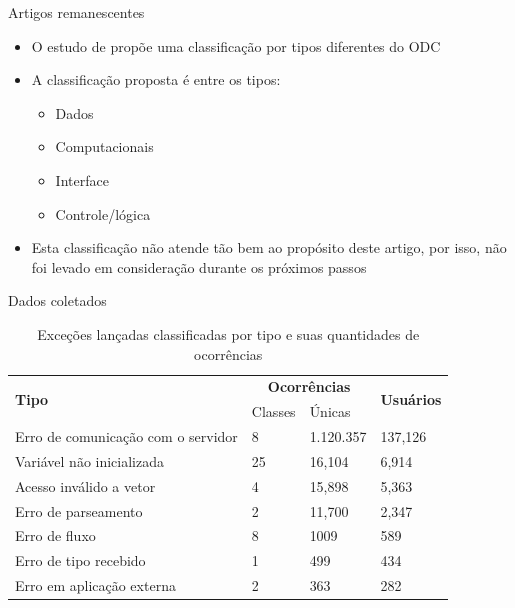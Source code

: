 \documentclass[brazilian]{beamer}
\begin{document}
\begin{frame}{Artigos remanescentes}
    \begin{itemize}
        \item O estudo de \cite{ast_based_aproach_to_classifying_defects} propõe uma classificação por tipos diferentes do ODC
        \item A classificação proposta é entre os tipos:
        \begin{itemize}
            \item Dados
            \item Computacionais
            \item Interface
            \item Controle/lógica
        \end{itemize}
        \item Esta classificação não atende tão bem ao propósito deste artigo, por isso, não foi levado em consideração durante os próximos passos
    \end{itemize}
\end{frame}

\begin{frame}{Dados coletados}
    \begin{table}[H]
        \centering
        \begin{tabularx}{\textwidth}{ l|X|l|l }
            \multirow{2}{*}{\textbf{Tipo}} & \multicolumn{2}{c|}{\textbf{Ocorrências}} & \multirow{2}{*}{\textbf{Usuários}} \\
            & Classes & Únicas & \\
            \hline
            Erro de comunicação com o servidor & 8 & 1.120.357 & 137,126 \\
            Variável não inicializada & 25 & 16,104 & 6,914 \\
            Acesso inválido a vetor & 4 & 15,898 & 5,363 \\
            Erro de parseamento & 2 & 11,700 & 2,347 \\
            Erro de fluxo & 8 & 1009 & 589 \\
            Erro de tipo recebido & 1 & 499 & 434 \\
            Erro em aplicação externa & 2 & 363 & 282 \
        \end{tabularx}
        \caption{Exceções lançadas classificadas por tipo e suas quantidades de ocorrências}
        \label{table:exceptions_classification_1}
    \end{table}
\end{frame}
\end{document}
